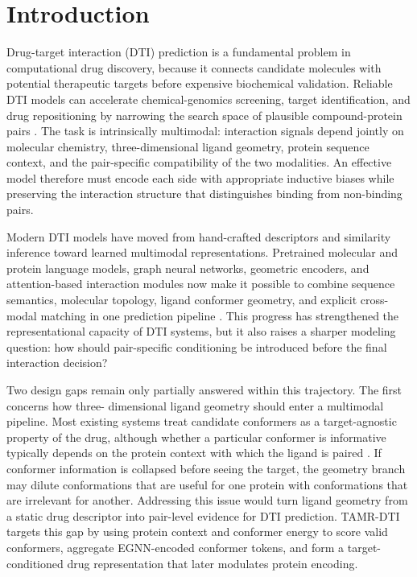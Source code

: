 \section{Introduction}
\label{sec:introduction}

Drug-target interaction (DTI) prediction is a fundamental problem in computational drug discovery,
because it connects candidate molecules with potential therapeutic targets before expensive biochemical
validation. Reliable DTI models can accelerate chemical-genomics screening, target identification, and
drug repositioning by narrowing the search space of plausible compound-protein pairs
\citep{keiser2007relating,yamanishi2008prediction,liu2007bindingdb}. The task is intrinsically multimodal:
interaction signals depend jointly on molecular chemistry, three-dimensional ligand geometry, protein
sequence context, and the pair-specific compatibility of the two modalities. An effective model therefore
must encode each side with appropriate inductive biases while preserving the interaction structure that
distinguishes binding from non-binding pairs.

Modern DTI models have moved from hand-crafted descriptors and similarity inference toward learned
multimodal representations. Pretrained molecular and protein language models, graph neural networks,
geometric encoders, and attention-based interaction modules now make it possible to combine sequence
semantics, molecular topology, ligand conformer geometry, and explicit cross-modal matching in one
prediction pipeline \citep{chithrananda2020chemberta,elnaggar2021prottrans,satorras2021egnn,
peng2024bindti,ji2026ldmdti}. This progress has strengthened the representational capacity of DTI systems,
but it also raises a sharper modeling question: how should pair-specific conditioning be introduced before
the final interaction decision?

Two design gaps remain only partially answered within this trajectory. The first concerns how three-
dimensional ligand geometry should enter a multimodal pipeline. Most existing systems treat candidate
conformers as a target-agnostic property of the drug, although whether a particular conformer is informative
typically depends on the protein context with which the ligand is paired
\citep{satorras2021egnn,ji2026ldmdti}. If conformer information is collapsed before seeing the target, the
geometry branch may dilute conformations that are useful for one protein with conformations that are
irrelevant for another. Addressing this issue would turn ligand geometry from a static drug descriptor into
pair-level evidence for DTI prediction. TAMR-DTI targets this gap by using protein context and conformer
energy to score valid conformers, aggregate EGNN-encoded conformer tokens, and form a target-conditioned
drug representation that later modulates protein encoding.


